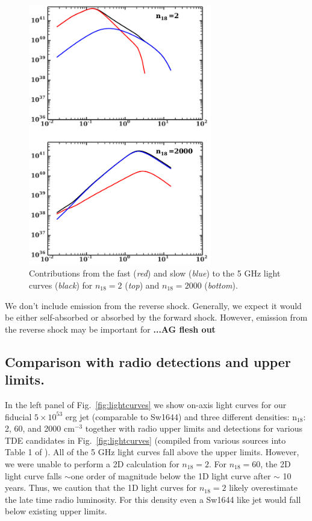 \documentclass[usenatbib,fleqn]{mnras}
\begin{document}
\begin{figure}
\includegraphics[width=8cm]{components.pdf}
\caption{\label{fig:components} Contributions from the fast
  (\textit{red}) and slow (\textit{blue}) to the 5 GHz light curves
  (\textit{black}) for $n_{18}=2$ (\textit{top}) and $n_{18}=2000$
  (\textit{bottom}).}
\end{figure}

We don't include emission from the reverse
shock. Generally, we expect it would be either self-absorbed or
absorbed by the forward shock. However, emission from the reverse
shock may be important for \textbf{...AG flesh out} 

\subsection{Comparison with radio detections and upper limits.}

In the left panel of Fig.~\ref{fig:lightcurves} we show on-axis light
curves for our fiducial $5\times 10^{53}$ erg jet (comparable to
Sw1644) and three different densities: n$_{18}$: 2, 60, and 2000
cm$^{-3}$ together with radio upper limits and detections for various
TDE candidates in Fig.~\ref{fig:lightcurves} (compiled from various
sources into Table 1 of \citealt{Mimica+2015}).  All of the 5 GHz
light curves fall above the upper limits. However, we were unable to
perform a 2D calculation for $n_{18}=2$.  For $n_{18}=60$, the 2D
light curve falls $\sim$one order of magnitude below the 1D light
curve after $\sim$ 10 years. Thus, we caution that the 1D light curves
for $n_{18}=2$ likely overestimate the late time radio luminosity. For
this density even a Sw1644 like jet would fall below existing upper
limits. 
\end{document}

